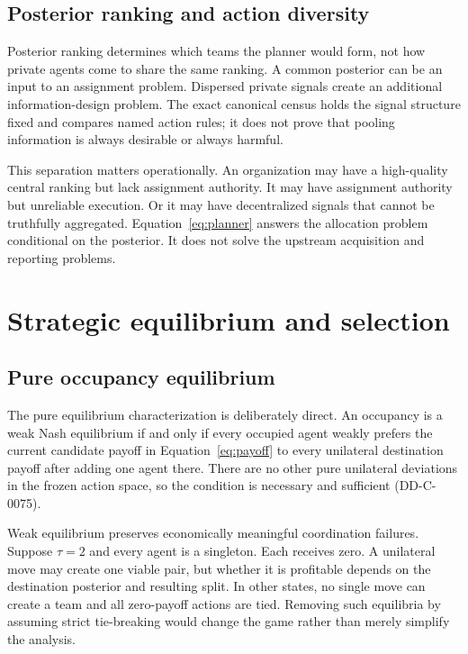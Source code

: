 \documentclass[11pt]{article}
\begin{document}
\subsection{Posterior ranking and action diversity}

Posterior ranking determines which teams the planner would form, not how
private agents come to share the same ranking. A common posterior can be an
input to an assignment problem. Dispersed private signals create an additional
information-design problem. The exact canonical census holds the signal
structure fixed and compares named action rules; it does not prove that pooling
information is always desirable or always harmful.

This separation matters operationally. An organization may have a high-quality
central ranking but lack assignment authority. It may have assignment authority
but unreliable execution. Or it may have decentralized signals that cannot be
truthfully aggregated. Equation~\ref{eq:planner} answers the allocation problem
conditional on the posterior. It does not solve the upstream acquisition and
reporting problems.

\section{Strategic equilibrium and selection}

\subsection{Pure occupancy equilibrium}

The pure equilibrium characterization is deliberately direct. An occupancy is
a weak Nash equilibrium if and only if every occupied agent weakly prefers the
current candidate payoff in Equation~\ref{eq:payoff} to every unilateral
destination payoff after adding one agent there. There are no other pure
unilateral deviations in the frozen action space, so the condition is necessary
and sufficient (DD-C-0075).

Weak equilibrium preserves economically meaningful coordination failures.
Suppose $\tau=2$ and every agent is a singleton. Each receives zero. A unilateral
move may create one viable pair, but whether it is profitable depends on the
destination posterior and resulting split. In other states, no single move can
create a team and all zero-payoff actions are tied. Removing such equilibria by
assuming strict tie-breaking would change the game rather than merely simplify
the analysis.
\end{document}
